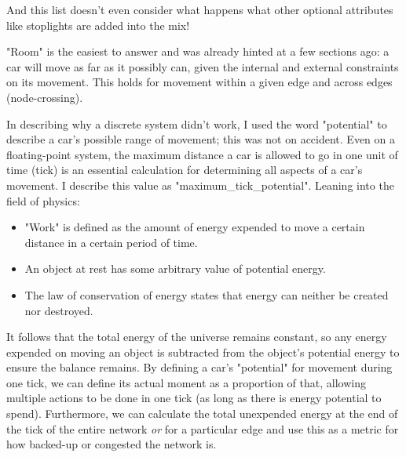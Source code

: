 \noindent And this list doesn't even consider what happens what other optional attributes like stoplights are added into the mix!\\

\par "Room" is the easiest to answer and was already hinted at a few sections ago:  a car will move as far as it possibly can, given the internal and external constraints on its movement.  This holds for movement within a given edge and across edges (node-crossing).  \\

\par In describing why a discrete system didn't work, I used the word "potential" to describe a car's possible range of movement; this was not on accident.  Even on a floating-point system, the maximum distance a car is allowed to go in one unit of time (tick) is an essential calculation for determining all aspects of a car's movement.  I describe this value as "maximum\_tick\_potential".  Leaning into the field of physics:
\begin{itemize}
    \item "Work" is defined as the amount of energy expended to move a certain distance in a certain period of time.
    \item An object at rest has some arbitrary value of potential energy.  
    \item The law of conservation of energy states that energy can neither be created nor destroyed.
\end{itemize}

\noindent It follows that the total energy of the universe remains constant, so any energy expended on moving an object is subtracted from the object's potential energy to ensure the balance remains.  By defining a car's "potential" for movement during one tick, we can define its actual moment as a proportion of that, allowing multiple actions to be done in one tick (as long as there is energy potential to spend).  Furthermore, we can calculate the total unexpended energy at the end of the tick of the entire network \textit{or} for a particular edge and use this as a metric for how backed-up or congested the network is. \\

